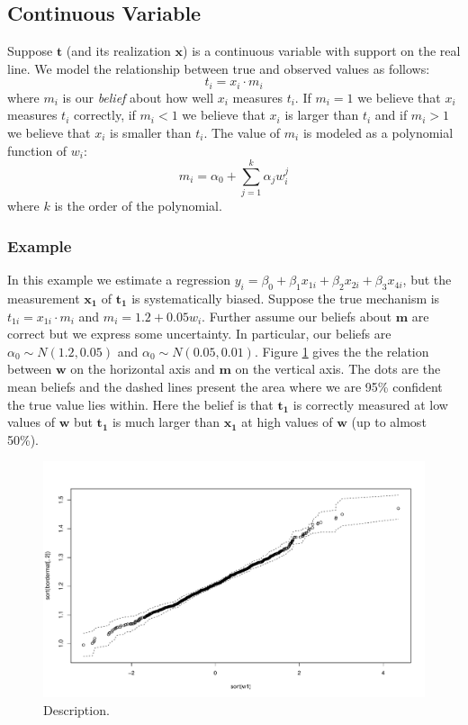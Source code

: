 \documentclass[fignum,letterpaper,12pt]{article}
\begin{document}
\subsection{Continuous Variable}

Suppose $\mathbf{t}$ (and its realization $\mathbf{x}$) is a continuous variable with support on the real line. We model the relationship between true and observed values as follows:
\begin{equation}
t_i = x_i \cdot m_i
\end{equation} 
where $m_i$ is our \textit{belief} about how well $x_i$ measures $t_i$. If $m_i=1$ we believe that $x_i$ measures $t_i$ correctly, if $m_i<1$ we believe that $x_i$ is larger than $t_i$ and if $m_i>1$ we believe that $x_i$ is smaller than $t_i$. The value of $m_i$ is modeled as a polynomial function of $w_i$:
\begin{equation}
m_i = \alpha_0 + \sum_{j=1}^{k} \alpha_j w_i^j
\end{equation} 
where $k$ is the order of the polynomial.

\subsubsection{Example}
In this example we estimate a regression $y_i=\beta_0 + \beta_1 x_{1i} + \beta_2 x_{2i} + \beta_3 x_{4i}$, but the measurement $\mathbf{x_1}$ of $\mathbf{t_1}$ is systematically biased. Suppose the true mechanism is $t_{1i}=x_{1i} \cdot m_i$ and $m_i=1.2 + 0.05 w_i$. Further assume our beliefs about $\mathbf{m}$ are correct but we express some uncertainty. In particular, our beliefs are $\alpha_0 \sim N(1.2, 0.05)$ and  $\alpha_0 \sim N(0.05, 0.01)$. Figure \ref{beliefplot} gives the the relation between $\mathbf{w}$ on the horizontal axis and $\mathbf{m}$ on the vertical axis. The dots are the mean beliefs and the dashed lines present the area where we are 95\% confident the true value lies within. Here the belief is that $\mathbf{t_1}$ is correctly measured at low values of $\mathbf{w}$ but $\mathbf{t_1}$ is much larger than $\mathbf{x_1}$ at high values of $\mathbf{w}$ (up to almost 50\%).

\begin{figure}[h]
\begin{center}
\includegraphics[width=.65\textwidth]{beliefplot.pdf} 
\caption{Description.}
\label{beliefplot}
\end{center}
\end{figure}
\end{document}
